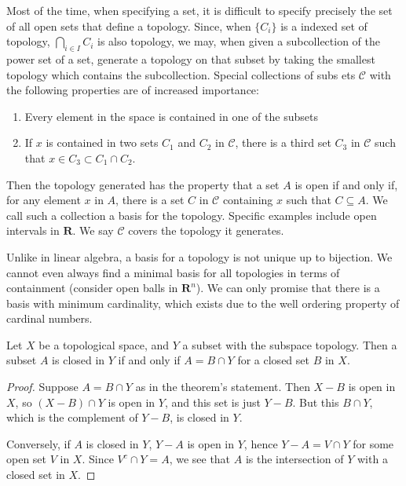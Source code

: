 Most of the time, when specifying a set, it is difficult to specify precisely the set of all open sets that define a topology. Since, when $\{ C_i \}$ is a indexed set of topology, $\bigcap_{i \in I} C_i$ is also topology, we may, when given a subcollection of the power set of a set, generate a topology on that subset by taking the smallest topology which contains the subcollection. Special collections of subs
ets $\mathcal{C}$ with the following properties are of increased importance:
%
\begin{enumerate}
    \item Every element in the space is contained in one of the subsets
    \item If $x$ is contained in two sets $C_1$ and $C_2$ in $\mathcal{C}$, there is a third set $C_3$ in $\mathcal{C}$ such that $x \in C_3 \subset C_1 \cap C_2$.
\end{enumerate}
%
Then the topology generated has the property that a set $A$ is open if and only if, for any element $x$ in $A$, there is a set $C$ in $\mathcal{C}$ containing $x$ such that $C \subseteq A$. We call such a collection a basis for the topology. Specific examples include open intervals in $\mathbf{R}$. We say $\mathcal{C}$ covers the topology it generates.

Unlike in linear algebra, a basis for a topology is not unique up to bijection. We cannot even always find a minimal basis for all topologies in terms of containment (consider open balls in $\mathbf{R}^n$). We can only promise that there is a basis with minimum cardinality, which exists due to the well ordering property of cardinal numbers.

\begin{theorem}
    Let $X$ be a topological space, and $Y$ a subset with the subspace topology. Then a subset $A$ is closed in $Y$ if and only if $A = B \cap Y$ for a closed set $B$ in $X$.
\end{theorem}
\begin{proof}
    Suppose $A = B \cap Y$ as in the theorem's statement. Then $X - B$ is open in $X$, so $(X - B) \cap Y$ is open in $Y$, and this set is just $Y - B$. But this $B \cap Y$, which is the complement of $Y - B$, is closed in $Y$.

    Conversely, if $A$ is closed in $Y$, $Y - A$ is open in $Y$, hence $Y - A = V \cap Y$ for some open set $V$ in $X$. Since $V^c \cap Y = A$, we see that $A$ is the intersection of $Y$ with a closed set in $X$.
\end{proof}





